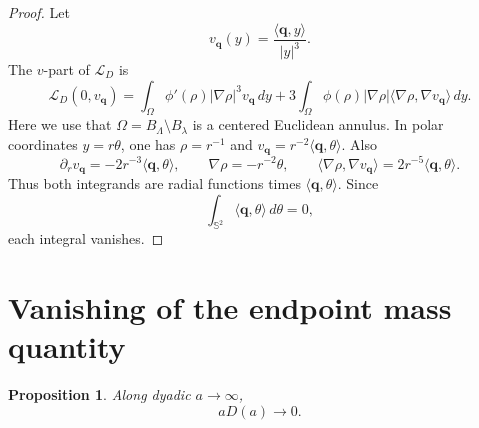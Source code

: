 \documentclass[11pt]{amsart}
\numberwithin{equation}{section}
\newtheorem{proposition}[theorem]{Proposition}
\theoremstyle{definition}
\newcommand{\Sph}{\mathbb S}
\newcommand{\rhoE}{\rho}
\newcommand{\LD}{\mathcal L_D}
\newcommand{\ip}[2]{\langle #1,#2\rangle}
\newcommand{\abs}[1]{\left\lvert #1\right\rvert}
\begin{document}
\begin{proof}
Let
$$
        v_{\mathbf q}(y)=\frac{\ip{\mathbf q}{y}}{\abs y^3}.
$$
The $v$-part of $\LD$ is
$$
        \LD(0,v_{\mathbf q})=\int_\Omega\phi'(\rhoE)\abs{\nabla\rhoE}^3v_{\mathbf q}\,dy
        +3\int_\Omega\phi(\rhoE)\abs{\nabla\rhoE}\ip{\nabla\rhoE}{\nabla v_{\mathbf q}}\,dy.
$$
Here we use that $\Omega=B_\Lambda\setminus B_\lambda$ is a centered Euclidean annulus.  In polar coordinates $y=r\theta$, one has $\rhoE=r^{-1}$ and $v_{\mathbf q}=r^{-2}\ip{\mathbf q}{\theta}$.  Also
$$
        \partial_r v_{\mathbf q}=-2r^{-3}\ip{\mathbf q}{\theta},
        \qquad \nabla\rhoE=-r^{-2}\theta,
        \qquad \ip{\nabla\rhoE}{\nabla v_{\mathbf q}}=2r^{-5}\ip{\mathbf q}{\theta}.
$$
Thus both integrands are radial functions times $\ip{\mathbf q}{\theta}$.  Since
$$
        \int_{\Sph^2}\ip{\mathbf q}{\theta}\,d\theta=0,
$$
each integral vanishes.
\end{proof}

\section{Vanishing of the endpoint mass quantity}
\label{sec:aD}

\begin{proposition}\label{prop:aD-zero}
Along dyadic $a\to\infty$,
\begin{equation}\label{eq:aD-zero}
        aD(a)\to0.
\end{equation}
\end{proposition}
\end{document}
